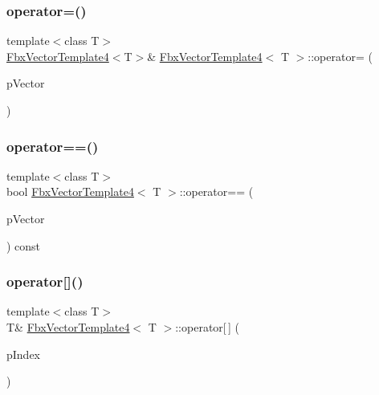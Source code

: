 \mbox{\label{class_fbx_vector_template4_ac771b9e505496a28848da457b5fca667}} 
\subsubsection{\texorpdfstring{operator=()}{operator=()}\hspace{0.1cm}{\footnotesize\ttfamily [3/3]}}
{\footnotesize\ttfamily template$<$class T$>$ \\
\hyperlink{class_fbx_vector_template4}{Fbx\+Vector\+Template4}$<$T$>$\& \hyperlink{class_fbx_vector_template4}{Fbx\+Vector\+Template4}$<$ T $>$\+::operator= (\begin{DoxyParamCaption}\item[{const \hyperlink{class_fbx_vector_template4}{Fbx\+Vector\+Template4}$<$ T $>$ \&}]{p\+Vector }\end{DoxyParamCaption})}

\mbox{\label{class_fbx_vector_template4_aeb4b2a1987cef4f774dd1d0c0c4f7ca5}} 
\subsubsection{\texorpdfstring{operator==()}{operator==()}}
{\footnotesize\ttfamily template$<$class T$>$ \\
bool \hyperlink{class_fbx_vector_template4}{Fbx\+Vector\+Template4}$<$ T $>$\+::operator== (\begin{DoxyParamCaption}\item[{const \hyperlink{class_fbx_vector_template4}{Fbx\+Vector\+Template4}$<$ T $>$ \&}]{p\+Vector }\end{DoxyParamCaption}) const}

\mbox{\label{class_fbx_vector_template4_a133f80e779cc4abca9113611c1989f2f}} 
\subsubsection{\texorpdfstring{operator[]()}{operator[]()}\hspace{0.1cm}{\footnotesize\ttfamily [1/2]}}
{\footnotesize\ttfamily template$<$class T$>$ \\
T\& \hyperlink{class_fbx_vector_template4}{Fbx\+Vector\+Template4}$<$ T $>$\+::operator\mbox{[}$\,$\mbox{]} (\begin{DoxyParamCaption}\item[{int}]{p\+Index }\end{DoxyParamCaption})}

